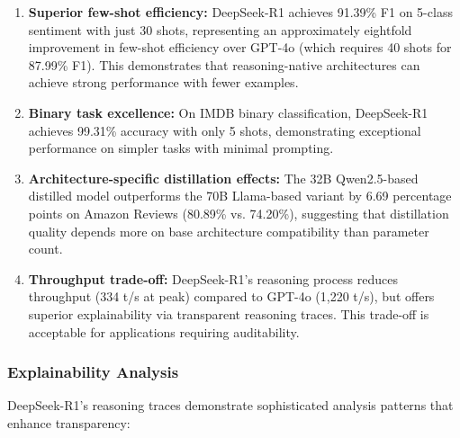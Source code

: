 \begin{enumerate}[leftmargin=*]
    \item \textbf{Superior few-shot efficiency:} DeepSeek-R1 achieves 91.39\% F1 on 5-class sentiment with just 30 shots, representing an approximately eightfold improvement in few-shot efficiency over GPT-4o (which requires 40 shots for 87.99\% F1). This demonstrates that reasoning-native architectures can achieve strong performance with fewer examples.
    
    \item \textbf{Binary task excellence:} On IMDB binary classification, DeepSeek-R1 achieves 99.31\% accuracy with only 5 shots, demonstrating exceptional performance on simpler tasks with minimal prompting.
    
    \item \textbf{Architecture-specific distillation effects:} The 32B Qwen2.5-based distilled model outperforms the 70B Llama-based variant by 6.69 percentage points on Amazon Reviews (80.89\% vs. 74.20\%), suggesting that distillation quality depends more on base architecture compatibility than parameter count.
    
    \item \textbf{Throughput trade-off:} DeepSeek-R1's reasoning process reduces throughput (334 t/s at peak) compared to GPT-4o (1,220 t/s), but offers superior explainability via transparent reasoning traces. This trade-off is acceptable for applications requiring auditability.
\end{enumerate}

\subsubsection{Explainability Analysis}

DeepSeek-R1's reasoning traces demonstrate sophisticated analysis patterns that enhance transparency:

